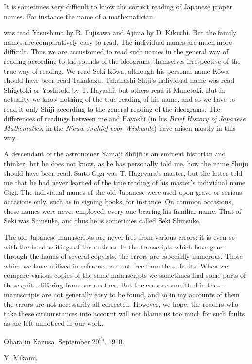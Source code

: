 \documentclass[11pt]{article}
\newcommand{\scanpage}[2]{\clearpage\setcounter{footnote}{0}\noindent{\footnotesize\color{gray}PDF page #1 · #2}\par\medskip}
\newcommand{\scanfooter}{}
\begin{document}
It is sometimes very difficult to know the correct reading of Japanese proper names. For instance the name of a mathematician
\scanfooter

\scanpage{0012}{Introductory Note, third page}
was read Yasushima by R. Fujisawa and Ajima by D. Kikuchi. But the family names are comparatively easy to read. The individual names are much more difficult. Thus we are accustomed to read such names in the general way of reading according to the sounds of the ideograms themselves irrespective of the true way of reading. We read Seki Kōwa, although his personal name Kōwa should have been read Takakazu. Takahashi Shiji's individual name was read Shigetoki or Yoshitoki by T. Hayashi, but others read it Munetoki. But in actuality we know nothing of the true reading of his name, and so we have to read it only Shiji according to the general reading of the ideograms. The differences of readings between me and Hayashi (in his \emph{Brief History of Japanese Mathematics}, in the \emph{Nieuw Archief voor Wiskunde}) have arisen mostly in this way.

A descendant of the astronomer Yamaji Shūjū is an eminent historian and thinker, but he does not know, as he has personally told me, how the name Shūjū should have been read. Saitō Gigi was T. Hagiwara's master, but the latter told me that he had never learned of the true reading of his master's individual name Gigi. The individual names of the old Japanese were used upon grave or serious occasions only, such as in signing books, for instance. On common occasions, these names were never employed, every one bearing his familiar name. That of Seki was Shinsuke, and thus he is sometimes called Seki Shinsuke.

The old Japanese manuscripts are never free from various errors; it is even so with the hand-writings of the authors. In the transcripts which have gone through the hands of several copyists, the errors are especially numerous. Those which we have utilised in reference are not free from these faults. When we compare various copies of the same manuscripts we sometimes find some parts of these quite differing from one another. But the errors committed in these manuscripts are not generally easy to be found, and so in my accounts of them the errors are not necessarily all corrected. However, we hope, the readers who take these circumstances into account will not blame us too much for such faults as are left unnoticed in our work.

\begin{flushleft}Ōhara in Kazusa, September 20\textsuperscript{th}, 1910.\end{flushleft}
\begin{flushright}Y. Mikami.\end{flushright}
\scanfooter
\end{document}
